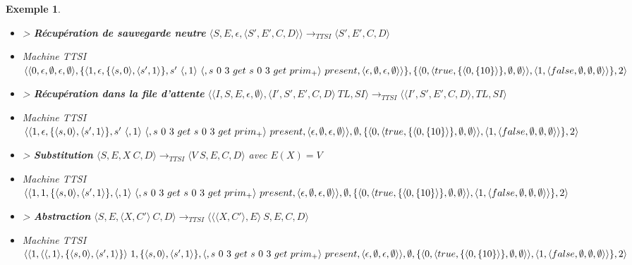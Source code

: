 \documentclass[10pt,a4paper]{report}
\newtheorem{ex}{Exemple}
\begin{document}
\begin{ex}
\begin{itemize}
			\item[] > \textbf{Récupération de sauvegarde neutre} $\langle S,E,\epsilon,\langle S',E',C,D\rangle\rangle
			\longrightarrow_{TTSI} 
			\langle S',E',C,D\rangle$
			\item[] Machine TTSI $\langle\langle 0,\epsilon,\emptyset,\epsilon,\emptyset\rangle,\{\langle 1,\epsilon,\{\langle s,0\rangle,\langle s',1\rangle\}, s'~\langle,1\rangle~\langle,s~0~3~get~s~0~3~get~prim_{+}\rangle~present ,\\\langle\epsilon,\emptyset,\epsilon,\emptyset\rangle\rangle\},\{\langle 0,\langle true,\{\langle 0,\{10\}\rangle\},\emptyset,\emptyset\rangle\rangle,\langle 1,\langle false,\emptyset,\emptyset,\emptyset\rangle\rangle\},2\rangle$
			\item[] > \textbf{Récupération dans la file d'attente} $\langle\langle I,S,E,\epsilon,\emptyset\rangle,\langle I',S',E',C,D\rangle~TL,SI\rangle 
			\longrightarrow_{TTSI} 
			\langle\langle I',S',E',C,D\rangle,TL,SI\rangle$
			\item[] Machine TTSI $\langle\langle 1,\epsilon,\{\langle s,0\rangle,\langle s',1\rangle\}, s'~\langle,1\rangle~\langle,s~0~3~get~s~0~3~get~prim_{+}\rangle~present ,\langle\epsilon,\emptyset,\epsilon,\emptyset\rangle\rangle,\emptyset,\{\langle 0,\langle true,\{\langle 0,\{10\}\rangle\},\emptyset,\emptyset\rangle\rangle,\\\langle 1,\langle false,\emptyset,\emptyset,\emptyset\rangle\rangle\},2\rangle$
			\item[] > \textbf{Substitution} $\langle S,E,X~C,D\rangle
			\longrightarrow_{TTSI} 
			\langle V~S,E,C,D\rangle$ avec $E(X) = V$
			\item[] Machine TTSI $\langle\langle 1,1,\{\langle s,0\rangle,\langle s',1\rangle\}, \langle,1\rangle~\langle,s~0~3~get~s~0~3~get~prim_{+}\rangle~present ,\langle\epsilon,\emptyset,\epsilon,\emptyset\rangle\rangle,\emptyset,\{\langle 0,\langle true,\{\langle 0,\{10\}\rangle\},\emptyset,\emptyset\rangle\rangle,\\\langle 1,\langle false,\emptyset,\emptyset,\emptyset\rangle\rangle\},2\rangle$
			\item[] > \textbf{Abstraction} $\langle S,E,\langle X,C'\rangle~C,D\rangle
			\longrightarrow_{TTSI} 
			\langle \langle\langle X,C'\rangle,E\rangle~S,E,C,D\rangle$
			\item[] Machine TTSI $\langle\langle 1,\langle\langle,1\rangle,\{\langle s,0\rangle,\langle s',1\rangle\}\rangle~1,\{\langle s,0\rangle,\langle s',1\rangle\}, \langle,s~0~3~get~s~0~3~get~prim_{+}\rangle~present ,\langle\epsilon,\emptyset,\epsilon,\emptyset\rangle\rangle,\emptyset,\\\{\langle 0,\langle true,\{\langle 0,\{10\}\rangle\},\emptyset,\emptyset\rangle\rangle,\langle 1,\langle false,\emptyset,\emptyset,\emptyset\rangle\rangle\},2\rangle$

\end{itemize}
\end{ex}
\end{document}
